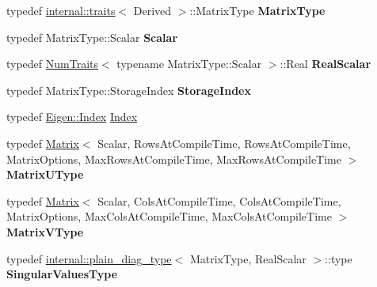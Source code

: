 \begin{DoxyCompactItemize}
typedef \hyperlink{struct_eigen_1_1internal_1_1traits}{internal\+::traits}$<$ Derived $>$\+::Matrix\+Type {\bfseries Matrix\+Type}
\item 
\mbox{\label{group___s_v_d___module_a9ac59dd357f42051be947ca7c4a23745}} 
typedef Matrix\+Type\+::\+Scalar {\bfseries Scalar}
\item 
\mbox{\label{group___s_v_d___module_a57f51134f3084c5b9998298569495920}} 
typedef \hyperlink{group___core___module_struct_eigen_1_1_num_traits}{Num\+Traits}$<$ typename Matrix\+Type\+::\+Scalar $>$\+::Real {\bfseries Real\+Scalar}
\item 
\mbox{\label{group___s_v_d___module_a98b3202ef30648952815e77338408f27}} 
typedef Matrix\+Type\+::\+Storage\+Index {\bfseries Storage\+Index}
\item 
typedef \hyperlink{namespace_eigen_a62e77e0933482dafde8fe197d9a2cfde}{Eigen\+::\+Index} \hyperlink{group___s_v_d___module_a6229a37997eca1072b52cca5ee7a2bec}{Index}
\item 
\mbox{\label{group___s_v_d___module_ab62c306c5d1efeae9bce88dee1b04965}} 
typedef \hyperlink{group___core___module_class_eigen_1_1_matrix}{Matrix}$<$ Scalar, Rows\+At\+Compile\+Time, Rows\+At\+Compile\+Time, Matrix\+Options, Max\+Rows\+At\+Compile\+Time, Max\+Rows\+At\+Compile\+Time $>$ {\bfseries Matrix\+U\+Type}
\item 
\mbox{\label{group___s_v_d___module_af2ec05d33dd5be28df6fcf56346e23ec}} 
typedef \hyperlink{group___core___module_class_eigen_1_1_matrix}{Matrix}$<$ Scalar, Cols\+At\+Compile\+Time, Cols\+At\+Compile\+Time, Matrix\+Options, Max\+Cols\+At\+Compile\+Time, Max\+Cols\+At\+Compile\+Time $>$ {\bfseries Matrix\+V\+Type}
\item 
\mbox{\label{group___s_v_d___module_a7426695e87c152fbb8bc7834dd8e6ce3}} 
typedef \hyperlink{struct_eigen_1_1internal_1_1plain__diag__type}{internal\+::plain\+\_\+diag\+\_\+type}$<$ Matrix\+Type, Real\+Scalar $>$\+::type {\bfseries Singular\+Values\+Type}
\end{DoxyCompactItemize}
